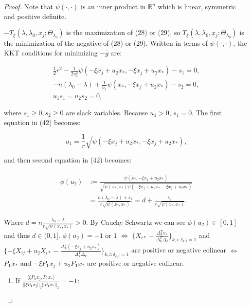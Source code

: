\documentclass{article}
\begin{document}
\begin{proof}
Note that $\psi(\cdot,\cdot)$ is an inner product in $\mathbb{R}^n$ which is linear, symmetric and positive definite.

$-T_\xi(\lambda,\lambda_0,x_j;\Theta_{\lambda_0})$ is the maximization of (28) or (29), so $T_\xi(\lambda,\lambda_0,x_j;\Theta_{\lambda_0})$ is the minimization of the negative of (28) or (29). Written in terms of $\psi(\cdot,\cdot)$, the KKT conditions for minimizing $-\bar{g}$ are:

\begin{equation}
    \begin{gathered}
        \frac{1}{2}r^2-\frac{1}{2u_1^2}\psi(-\xi x_j+u_2x_*,-\xi x_j+u_2x_*)-s_1=0,\\
        -n(\lambda_0-\lambda)+\frac{1}{u_1}\psi(x_*,-\xi x_j+u_2x_*)-s_2=0,\\
        u_1s_1=u_2s_2=0,
    \end{gathered}
\end{equation}

where $s_1\geq0,s_2\geq0$ are slack variables. Because $u_1>0$, $s_1=0$. The first equation in (42) becomes:

\begin{equation}
    u_1=\frac{1}{r}\sqrt{\psi(-\xi x_j+u_2x_*,-\xi x_j+u_2x_*)},
\end{equation}

and then second equation in (42) becomes:

\begin{gather}
    \begin{aligned}
            \phi(u_2)&:=\frac{\psi(x_*,-\xi x_j+u_2x_*)}{\sqrt{\psi(x_*,x_*)\psi(-\xi x_j+u_2x_*,-\xi x_j+u_2x_*)}}\\
            &=\frac{n(\lambda_0-\lambda)+s_2}{r\sqrt{\psi(x_*,x_*)}}=d+\frac{s_2}{r\sqrt{\psi(x_*,x_*)}}.
    \end{aligned}
\end{gather}

Where $d=n\frac{\lambda_0-\lambda}{r\sqrt{\psi(x_*,x_*)}}>0$. By Cauchy Schwartz we can see $\phi(u_2)\in[0,1]$ and thus $d\in(0,1]$. $\phi(u_2)=-1$ or $1$ $\iff$ $\{X_{i*}-\frac{\Delta_k^Tx_*}{\Delta_k^T\Delta_k}\}_{k,i:\delta_{k,i}=1}$ and $\{-\xi X_{ij}+u_2X_{i*}-\frac{\Delta_k^T(-\xi x_j+u_2x_*)}{\Delta_k^T\Delta_k}\}_{k,i:\delta_{k,i}=1}$ are positive or negative colinear $\iff$ $P_\mathbf{1}x_*$  and $-\xi P_\mathbf{1} x_j+u_2P_\mathbf{1}x_*$ are positive or negative colinear.


\begin{enumerate}
    \item If $\frac{\langle\xi P_{\mathbf{1}}x_j,P_{\mathbf{1}}x_*\rangle}{||\xi P_{\mathbf{1}}x_j||_2||P_{\mathbf{1}}x_*||_2}=-1$:
    

\end{enumerate}
\end{proof}
\end{document}
